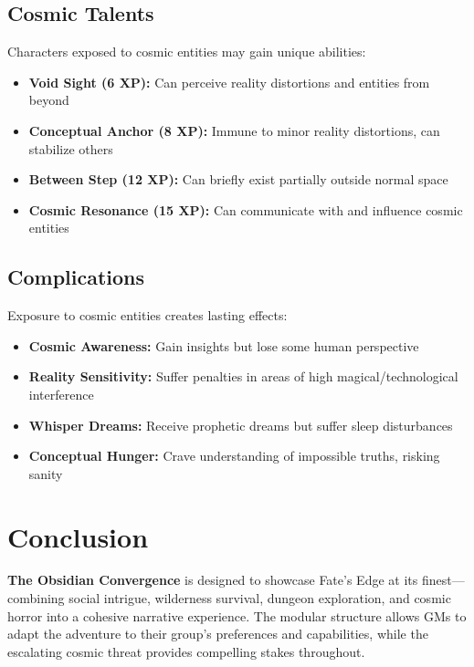 \documentclass[12pt,twoside]{article}
\begin{document}
\subsection{Cosmic Talents}

Characters exposed to cosmic entities may gain unique abilities:

\begin{itemize}[leftmargin=*]
\item \textbf{Void Sight (6 XP):} Can perceive reality distortions and entities from beyond
\item \textbf{Conceptual Anchor (8 XP):} Immune to minor reality distortions, can stabilize others
\item \textbf{Between Step (12 XP):} Can briefly exist partially outside normal space
\item \textbf{Cosmic Resonance (15 XP):} Can communicate with and influence cosmic entities
\end{itemize}

\subsection{Complications}

Exposure to cosmic entities creates lasting effects:

\begin{itemize}[leftmargin=*]
\item \textbf{Cosmic Awareness:} Gain insights but lose some human perspective
\item \textbf{Reality Sensitivity:} Suffer penalties in areas of high magical/technological interference
\item \textbf{Whisper Dreams:} Receive prophetic dreams but suffer sleep disturbances
\item \textbf{Conceptual Hunger:} Crave understanding of impossible truths, risking sanity
\end{itemize}

\section{Conclusion}

\textbf{The Obsidian Convergence} is designed to showcase Fate's Edge at its finest---combining social intrigue, wilderness survival, dungeon exploration, and cosmic horror into a cohesive narrative experience. The modular structure allows GMs to adapt the adventure to their group's preferences and capabilities, while the escalating cosmic threat provides compelling stakes throughout.
\end{document}
